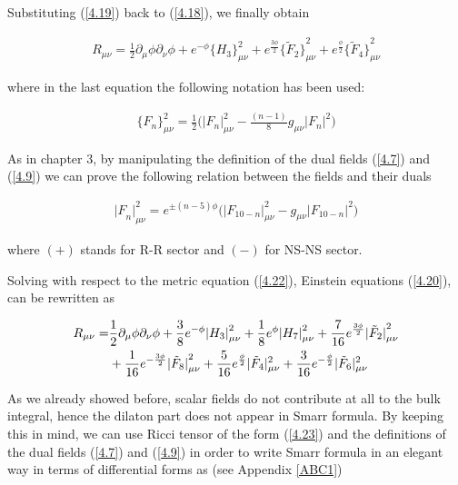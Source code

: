 \documentclass[a4paper,notitlepage]{report}
\begin{document}
\vspace{0.5em}
Substituting (\ref{4.19}) back to (\ref{4.18}), we finally obtain

\begin{align} \label{4.20}
R_{\mu\nu} = \frac{1}{2} \partial_{\mu} \phi \partial_{\nu} \phi + e^{-\phi} {\{ {H}_{3}\}}^2_{\mu\nu} + e^{\frac{3\phi}{2}} {\{ {\tilde{F}}_{2}\}}^2_{\mu\nu} + e^{\frac{\phi}{2}} {\{ {\tilde{F}}_{4}\}}^2_{\mu\nu}
\end{align} 

\vspace{0.5em}
where in the last equation the following notation has been used:

\begin{align} \label{4.21}
{\{ {F}_{n}\}}^2_{\mu\nu} = \frac{1}{2} \Big( {|{F}_{n}|}^2_{\mu\nu} - \frac{(n-1)}{8} g_{\mu\nu} {|{F}_{n}|}^2 \Big)
\end{align}

\vspace{0.5em}
As in chapter 3, by manipulating the definition of the dual fields (\ref{4.7}) and (\ref{4.9}) we can prove the following relation between the fields and their duals

\begin{align} \label{4.22}
{{|F}_n|}^2_{\mu\nu} = e^{\pm (n-5)\phi} \Big(|F_{10-n}|^2_{\mu\nu} - g_{\mu\nu} |F_{10-n}|^2 \Big)
\end{align}

\vspace{0.5em}
where $(+)$ stands for R-R sector and $(-)$ for NS-NS sector.

Solving with respect to the metric equation (\ref{4.22}), Einstein equations (\ref{4.20}), can be rewritten as

\begin{align} \label{4.23}
R_{\mu\nu} = & \frac{1}{2} \partial_{\mu} \phi \partial_{\nu} \phi + \frac{3}{8} e^{-\phi} {|H_{3}|}^2_{\mu\nu} + \frac{1}{8} e^{\phi} {|H_{7}|}^2_{\mu\nu} + \frac{7}{16} e^{\frac{3\phi}{2}}|{\tilde{F}_{2}|}^2_{\mu\nu} \notag \\ 
& + \frac{1}{16} e^{-\frac{3\phi}{2}} |{\tilde{F}_{8}|}^2_{\mu\nu} + \frac{5}{16} e^{\frac{\phi}{2}} |{\tilde{F}_{4}}|^2_{\mu\nu} + \frac{3}{16} e^{-\frac{\phi}{2}} |{\tilde{F}_{6}}|^2_{\mu\nu}
\end{align}

\vspace{0.5em}
As we already showed before, scalar fields do not contribute at all to the bulk integral, hence the dilaton part does not appear in Smarr formula. By keeping this in mind, we can use Ricci tensor of the form (\ref{4.23}) and the definitions of the dual fields (\ref{4.7}) and (\ref{4.9}) in order to write Smarr formula in an elegant way in terms of differential forms as (see Appendix \ref{ABC1})  
\end{document}
